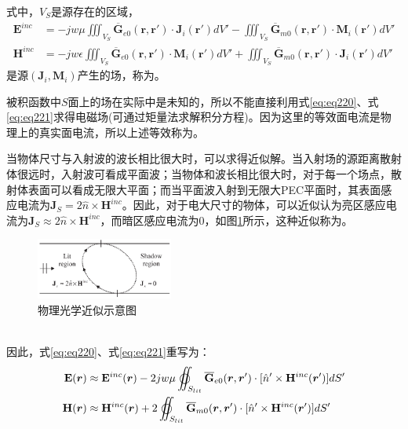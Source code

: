 \documentclass{article}
\numberwithin{equation}{section}
\renewcommand{\vec}[1]{\boldsymbol{#1}}
\begin{document}
式中，$V_S$是源存在的区域，
\begin{align}
    \label{eq:eq222}
    \mathbf{E}^{inc}&=-jw\mu\iiint_{V_S}\overline{\mathbf{G}}_{e0}(\vec{r},\vec{r}')\cdot \mathbf{J}_i(\vec{r}')dV'-\iiint_{V_S}\overline{\mathbf{G}}_{m0}(\vec{r},\vec{r}')\cdot \mathbf{M}_i(\vec{r}')dV' \\
    \label{eq:eq223}
    \mathbf{H}^{inc}&=-jw\epsilon\iiint_{V_S}\overline{\mathbf{G}}_{e0}(\vec{r},\vec{r}')\cdot \mathbf{M}_i(\vec{r}')dV'+\iiint_{V_S}\overline{\mathbf{G}}_{m0}(\vec{r},\vec{r}')\cdot \mathbf{J}_i(\vec{r}')dV'
\end{align}
是源$(\mathbf{J}_i,\mathbf{M}_i)$产生的场，称为\textbf{\color{blue}{入射场}}。\par
被积函数中$S$面上的场在实际中是未知的，所以不能直接利用式\ref{eq:eq220}、式\ref{eq:eq221}求得电磁场(可通过矩量法求解积分方程)。因为这里的等效面电流是物理上的真实面电流，所以上述等效称为\textbf{\color{blue}{物理等效}}。\par
当物体尺寸与入射波的波长相比很大时，可以求得近似解。当入射场的源距离散射体很远时，入射波可看成平面波；当物体和波长相比很大时，对于每一个场点，散射体表面可以看成无限大平面；而当平面波入射到无限大PEC平面时，其表面感应电流为$\mathbf{J}_S=2\hat{n}\times\mathbf{H}^{inc}$。因此，对于电大尺寸的物体，可以近似认为亮区感应电流为$\mathbf{J}_S\approx2\hat{n}\times\mathbf{H}^{inc}$，而暗区感应电流为0，如图\ref{fig:fig18}所示，这种近似称为\textbf{\color{blue}{物理光学近似}}。
\begin{figure}[ht]
    \centering
    \includegraphics[width=0.4\textwidth]{物理光学近似示意图.PNG}
    \caption{物理光学近似示意图}
    \label{fig:fig18}
\end{figure}
\\因此，式\ref{eq:eq220}、式\ref{eq:eq221}重写为：
\begin{align}
    \label{eq:eq224}
    \mathbf{E}(\vec{r})&\approx\mathbf{E}^{inc}(\vec{r})-2jw\mu\varoiint_{S_{lit}}\overline{\mathbf{G}}_{e0}(\vec{r},\vec{r}')\cdot [\hat{n}'\times\mathbf{H}^{inc}(\vec{r}')]dS' \\
    \label{eq:eq225}
    \mathbf{H}(\vec{r})&\approx\mathbf{H}^{inc}(\vec{r})+2\varoiint_{S_{lit}}\overline{\mathbf{G}}_{m0}(\vec{r},\vec{r}')\cdot [\hat{n}'\times\mathbf{H}^{inc}(\vec{r}')]dS'
\end{align}
\end{document}
